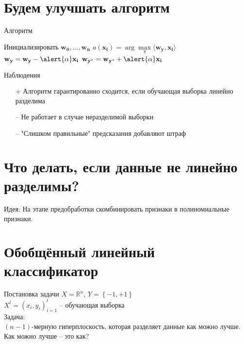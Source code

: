 \documentclass[10pt]{beamer}
\begin{document}
\section{Будем улучшать алгоритм}

\begin{frame}{Алгоритм}
	\begin{algorithmic}[1]
            \State Инициализировать ${\mathbf{w_0}, \dots, \mathbf{w_n}}$
                 \State $a(\mathbf{x_i}) = \arg\max\limits_{y} \langle \mathbf{w_y}, \mathbf{x_i} \rangle$                 
                   \State $\mathbf{w_y} = \mathbf{w_y} - \alert{\alpha} \mathbf{x_i}$
                   \State $\mathbf{w_{y^{*}}} = \mathbf{w_{y^{*}}} + \alert{\alpha} \mathbf{x_i}$
                 \EndIf  
               \EndFor
           	\EndRepeat
        \EndFunction
    \end{algorithmic}
\end{frame}

\begin{frame} {Наблюдения}
    \begin{itemize} [<+->]
      \item[+] Алгоритм гарантированно сходится, если обучающая выборка линейно разделима
      \bigbreak
      \item[--] Не работает в случае неразделимой выборки 
      \item[--] "Слишком правильные" предсказания добавляют штраф      %
    \end{itemize}
\end{frame}

\section{Что делать, если данные не линейно разделимы?}

\begin{frame}
  \alert{Идея}: На этапе предобработки скомбинировать признаки в полиномиальные признаки.
\end{frame}

\section{Обобщённый линейный классификатор}

\begin{frame}{Постановка задачи}
  $X = \mathbb{R}^n$, ${Y = \left\{ -1, + 1\right\}}$\\
  ${X^l = (x_i, y_i)_{i = 1}^l}$ -- обучающая выборка\\
  \bigbreak
  \alert{Задача}:\\
  $(n-1)$-мерную гиперплоскость, которая разделяет данные \alert{как можно лучше}.
  \bigbreak \pause
  Как можно лучше -- это как?
\end{frame}
\end{document}
